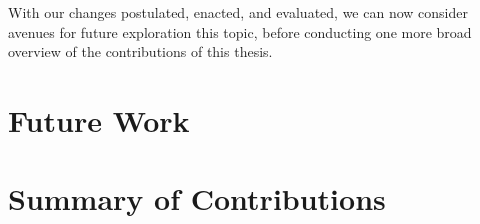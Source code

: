 With our changes postulated, enacted, and evaluated, we can now consider avenues
for future exploration this topic, before conducting one more broad overview of
the contributions of this thesis.

\section{Future Work}



\section{Summary of Contributions}


